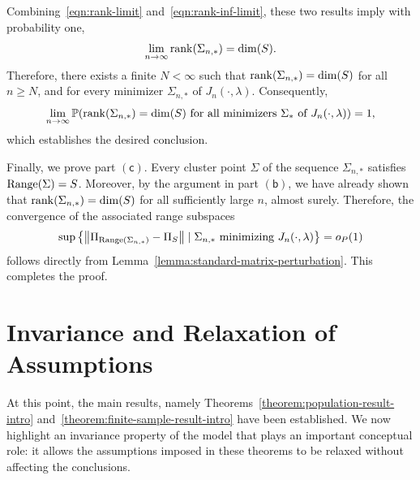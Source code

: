 \documentclass[sn-mathphys-num]{sn-jnl}%
\numberwithin{equation}{section}
\newcommand{\norm}[1]{\left\|{#1}\right\|} %
\renewcommand{\P}{\mathbb{P}}
\newcommand{\Range}{{\rm Range}}
\newcommand{\rank}{{\rm rank}}
\theoremstyle{thmstyleone}%
\theoremstyle{thmstyletwo}%
\theoremstyle{thmstylethree}%
\begin{document}
Combining~\eqref{eqn:rank-limit} and~\eqref{eqn:rank-inf-limit}, these two results imply with probability one, 
\begin{equation*}
	\lim_{n \to \infty} \rank(\Sigma_{n,*}) = \dim(S).
\end{equation*}
Therefore, there exists a finite $N< \infty$ such that $\rank(\Sigma_{n, *}) = \dim(S)$ for all $n \ge N$, 
and for every minimizer $\Sigma_{n,*}$ of $J_n(\cdot,\lambda)$. Consequently, 
\begin{equation*}
\lim_{n \to \infty} 
\P\!\left(
\rank(\Sigma_{n, *}) = \dim(S)
\ \text{for all minimizers } \Sigma_* \text{ of } J_n(\cdot,\lambda)
\right) = 1,
\end{equation*} 
which establishes the desired conclusion.


Finally, we prove part $\mathsf{(c)}$. Every cluster point $\Sigma$ of the sequence ${\Sigma_{n,*}}$ satisfies
$\Range(\Sigma) = S$. Moreover, by the argument in part $\mathsf{(b)}$, we have already shown that 
$\rank(\Sigma_{n, *}) = \dim(S)$ for all sufficiently large $n$, almost surely. Therefore, the convergence of the 
associated range subspaces
\begin{equation*}
	\sup\left\{\norm{\Pi_{\Range(\Sigma_{n, *})}- \Pi_S} \mid \Sigma_{n, *}~\text{minimizing}~J_n(\cdot, \lambda) \right\} = o_P(1)
\end{equation*}  
follows directly from Lemma~\ref{lemma:standard-matrix-perturbation}. This completes the proof.


\section{Invariance and Relaxation of Assumptions} 
\label{sec:invariance-and-relaxation}
\indent\indent 
At this point, the main results, namely
Theorems~\ref{theorem:population-result-intro}
and~\ref{theorem:finite-sample-result-intro} have been established.
We now highlight an invariance property of the model that plays an
important conceptual role: it allows the assumptions imposed in these theorems 
to be relaxed without affecting the conclusions.
\end{document}
